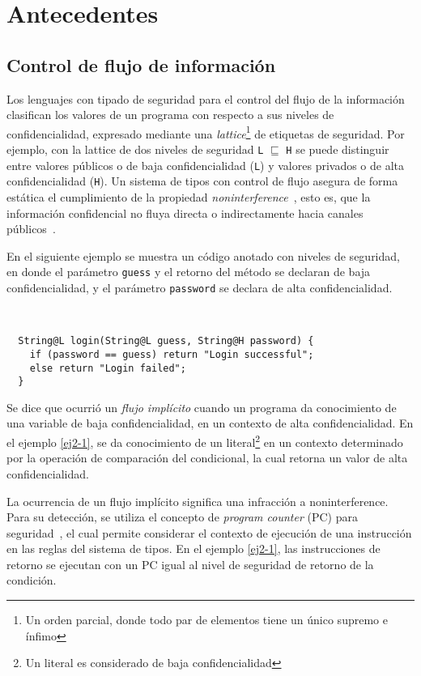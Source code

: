 \chapter{Antecedentes}

\section{Control de flujo de información}
Los lenguajes con tipado de seguridad para el control del flujo de la información clasifican los valores de un programa con respecto a sus niveles de confidencialidad, expresado mediante una \emph{lattice}\footnote{Un orden parcial, donde todo par de elementos tiene un único supremo e ínfimo} de etiquetas de seguridad. Por ejemplo, con la lattice de dos niveles de seguridad \texttt{L} $\sqsubseteq$ \texttt{H} se puede distinguir entre valores públicos o de baja confidencialidad (\texttt{L}) y valores privados o de alta confidencialidad (\texttt{H}). Un sistema de tipos con control de flujo asegura de forma estática el cumplimiento de la propiedad \emph{noninterference}~\cite{noninterference}, esto es, que la información confidencial no fluya directa o indirectamente hacia canales públicos~\cite{volpanoAl:S96}.

En el siguiente ejemplo se muestra un código anotado con niveles de seguridad, en donde el parámetro \texttt{guess} y el retorno del método se declaran de baja confidencialidad, y el parámetro \texttt{password} se declara de alta confidencialidad.

\begin{ej} \ \\
  \normalfont
  \label{ej2-1}
\begin{lstlisting}
  String@L login(String@L guess, String@H password) {
    if (password == guess) return "Login successful";
    else return "Login failed";
  }
\end{lstlisting}
\end{ej}

Se dice que ocurrió un \emph{flujo implícito} cuando un programa da conocimiento de una variable de baja confidencialidad, en un contexto de alta confidencialidad. En el ejemplo \ref{ej2-1}, se da conocimiento de un literal\footnote{Un literal es considerado de baja confidencialidad} en un contexto determinado por la operación de comparación del condicional, la cual retorna un valor de alta confidencialidad.

La ocurrencia de un flujo implícito significa una infracción a noninterference. Para su detección, se utiliza el concepto de \textit{program counter} (PC) para seguridad~\cite{pc}, el cual permite considerar el contexto de ejecución de una instrucción en las reglas del sistema de tipos. En el ejemplo \ref{ej2-1}, las instrucciones de retorno se ejecutan con un PC igual al nivel de seguridad de retorno de la condición.

